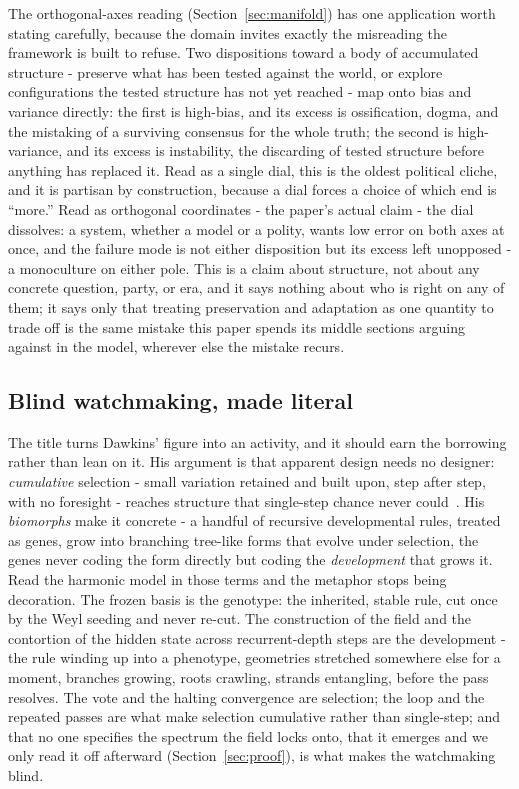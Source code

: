 The orthogonal-axes reading (Section~\ref{sec:manifold}) has one application worth stating carefully, because the domain invites exactly the misreading the framework is built to refuse. Two dispositions toward a body of accumulated structure - preserve what has been tested against the world, or explore configurations the tested structure has not yet reached - map onto bias and variance directly: the first is high-bias, and its excess is ossification, dogma, and the mistaking of a surviving consensus for the whole truth; the second is high-variance, and its excess is instability, the discarding of tested structure before anything has replaced it. Read as a single dial, this is the oldest political cliche, and it is partisan by construction, because a dial forces a choice of which end is ``more.'' Read as orthogonal coordinates - the paper's actual claim - the dial dissolves: a system, whether a model or a polity, wants low error on both axes at once, and the failure mode is not either disposition but its excess left unopposed - a monoculture on either pole. This is a claim about structure, not about any concrete question, party, or era, and it says nothing about who is right on any of them; it says only that treating preservation and adaptation as one quantity to trade off is the same mistake this paper spends its middle sections arguing against in the model, wherever else the mistake recurs.

\subsection{Blind watchmaking, made literal}
\label{sec:watchmaker}

The title turns Dawkins' figure into an activity, and it should earn the borrowing rather than lean on it. His argument is that apparent design needs no designer: \textit{cumulative} selection - small variation retained and built upon, step after step, with no foresight - reaches structure that single-step chance never could~\cite{dawkins1986}. His \textit{biomorphs} make it concrete - a handful of recursive developmental rules, treated as genes, grow into branching tree-like forms that evolve under selection, the genes never coding the form directly but coding the \textit{development} that grows it. Read the harmonic model in those terms and the metaphor stops being decoration. The frozen basis is the genotype: the inherited, stable rule, cut once by the Weyl seeding and never re-cut. The construction of the field and the contortion of the hidden state across recurrent-depth steps are the development - the rule winding up into a phenotype, geometries stretched somewhere else for a moment, branches growing, roots crawling, strands entangling, before the pass resolves. The vote and the halting convergence are selection; the loop and the repeated passes are what make selection cumulative rather than single-step; and that no one specifies the spectrum the field locks onto, that it emerges and we only read it off afterward (Section~\ref{sec:proof}), is what makes the watchmaking blind.

